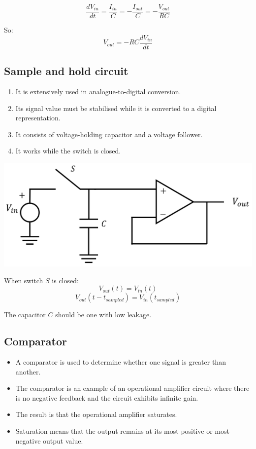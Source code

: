 \documentclass[11pt]{article}
\begin{document}
\[\frac{dV_{in}}{dt} = \frac{I_{in}}{C} = -\frac{I_{out}}{C} = - \frac{V_{out}}{RC}\]

So:
\[V_{out} = - RC \frac{dV_{in}}{dt}\]

 \newpage
\subsection{Sample and hold circuit}
\label{sec:org601b43a}
\begin{enumerate}
\item It is extensively used in analogue-to-digital conversion.
\item Its signal value must be stabilised while it is converted to a digital representation.
\item It consists of voltage-holding capacitor and a voltage follower.
\item It works while the switch is closed.
\end{enumerate}

\begin{center}
\includegraphics[width=.9\linewidth]{./images/sample-and-hold-circuit.png}
\end{center}

When switch \(S\) is closed:
\[V_{out} (t) = V_{in} (t)\]
\[V_{out} (t - t_{sampled}) = V_{in} (t_{sampled})\]

The capacitor \(C\) should be one with low leakage.

 \newpage
\subsection{Comparator}
\label{sec:org1fd53ae}
\begin{itemize}
\item A comparator is used to determine whether one signal is greater than another.
\item The comparator is an example of an operational amplifier circuit where there is no negative feedback and the circuit exhibits infinite gain.
\item The result is that the operational amplifier saturates.
\item Saturation means that the output remains at its most positive or most negative output value.
\end{itemize}
\end{document}
